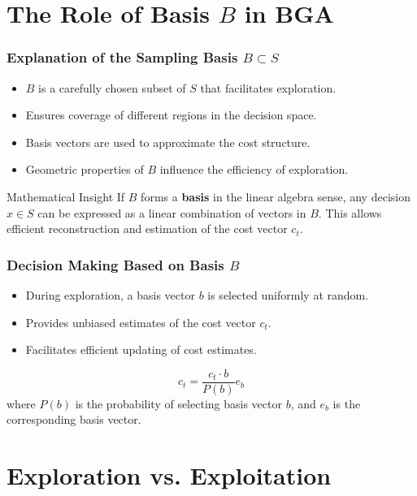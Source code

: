 \documentclass{beamer}
\begin{document}
\section{The Role of Basis \( B \) in BGA}

\begin{frame}
\frametitle{Explanation of the Sampling Basis \( B \subset S \)}
\begin{itemize}
    \item \( B \) is a carefully chosen subset of \( S \) that facilitates exploration.
    \item Ensures coverage of different regions in the decision space.
    \item Basis vectors are used to approximate the cost structure.
    \item Geometric properties of \( B \) influence the efficiency of exploration.
\end{itemize}
\begin{exampleblock}{Mathematical Insight}
    If \( B \) forms a \textbf{basis} in the linear algebra sense, any decision \( x \in S \) can be expressed as a linear combination of vectors in \( B \). This allows efficient reconstruction and estimation of the cost vector \( c_t \).
\end{exampleblock}
\end{frame}

\begin{frame}
\frametitle{Decision Making Based on Basis \( B \)}
\begin{itemize}
    \item During exploration, a basis vector \( b \) is selected uniformly at random.
    \item Provides unbiased estimates of the cost vector \( c_t \).
    \item Facilitates efficient updating of cost estimates.
\end{itemize}
\begin{equation*}
    \hat{c}_t = \frac{c_t \cdot b}{P(b)} e_b
    \end{equation*}
    where \( P(b) \) is the probability of selecting basis vector \( b \), and \( e_b \) is the corresponding basis vector.
\end{frame}

\section{Exploration vs. Exploitation}
\end{document}
